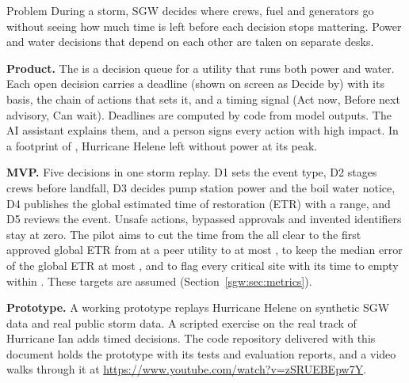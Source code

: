 \documentclass[fontsize=10pt,a4paper,DIV=12,parskip=half-,numbers=noenddot,headsepline,captions=tableheading]{scrartcl}
\begin{document}
\thispagestyle{plain.scrheadings}


\begin{sgwbox}{Problem}
During a storm, SGW decides where crews, fuel and generators go without seeing how much time is left before each decision stops mattering. Power and water decisions that depend on each other are taken on separate desks.
\end{sgwbox}

\textbf{Product.} The \sgwproduct{} is a decision queue for a utility that runs both power and water.
Each open decision carries a deadline (shown on screen as Decide by) with its basis, the chain of actions that sets it, and a timing signal (Act now, Before next advisory, Can wait).
Deadlines are computed by code from model outputs. The AI assistant explains them, and a person signs every action with high impact.
In a footprint of , Hurricane Helene left  without power at its peak.

\textbf{MVP.} Five decisions in one storm replay. D1 sets the event type, D2 stages crews before landfall, D3 decides pump station power and the boil water notice, D4 publishes the global estimated time of restoration (ETR) with a range, and D5 reviews the event. Unsafe actions, bypassed approvals and invented identifiers stay at zero.
The pilot aims to cut the time from the all clear to the first approved global ETR from  at a peer utility to at most , to keep the median error of the global ETR at most , and to flag every critical site with its time to empty within . These targets are assumed (Section~\ref{sgw:sec:metrics}).

\textbf{Prototype.} A working prototype replays Hurricane Helene on synthetic SGW data and real public storm data. A scripted exercise on the real track of Hurricane Ian adds  timed decisions. The code repository delivered with this document holds the prototype with its tests and evaluation reports, and a video walks through it at \url{https://www.youtube.com/watch?v=zSRUEBEpw7Y}.
\end{document}
